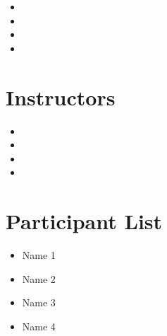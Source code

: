 \documentclass[11pt]{report}
\begin{document}
\begin{multicols}{2}
    \begin{itemize}
        \item[] 
        \item[] 
        \item[] 
        \item[] 
    \end{itemize}
\end{multicols}


\section*{Instructors}

\begin{multicols}{2}
    \begin{itemize}
        \item[] 
        \item[] 
        \item[] 
        \item[] 
    \end{itemize}
\end{multicols}

\section*{Participant List}

\begin{multicols}{2}
    \begin{itemize}
        \item[] Name 1
        \item[] Name 2
        \item[] Name 3
        \item[] Name 4
    \end{itemize}
\end{multicols}

\tableofcontents


\end{document}
